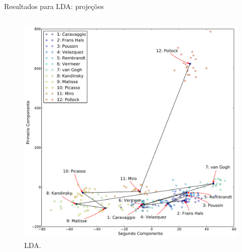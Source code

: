 \documentclass{beamer}
\begin{document}
\begin{frame}{Resultados para LDA: projeções}
\begin{columns}
    \begin{column}{.49\textwidth}
\begin{figure}[h!]
\begin{center}
\includegraphics[width=\columnwidth]{figs/caso3_g1}
        \caption{LDA.}
\end{center}
\end{figure}
\end{column}
\end{columns}

\end{frame}
\end{document}
